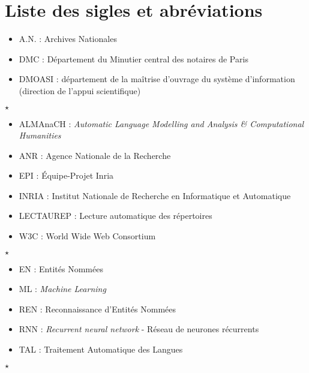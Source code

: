 \chapter*{Liste des sigles et abréviations}

\begin{itemize}
    \item A.N. : Archives Nationales
    \item DMC : Département du Minutier central des notaires de Paris  
    \item DMOASI : département de la maîtrise d’ouvrage du système d’information (direction de l’appui scientifique) 
\end{itemize}

\begin{center}
$\star$
\end{center} 

\begin{itemize}
    \item ALMAnaCH : \emph{Automatic Language Modelling and Analysis \& Computational Humanities}
    \item ANR : Agence Nationale de la Recherche
    \item EPI : Équipe-Projet Inria
    \item INRIA : Institut Nationale de Recherche en Informatique et Automatique
    \item LECTAUREP : Lecture automatique des répertoires
    \item W3C : World Wide Web Consortium
\end{itemize}

\begin{center}
$\star$
\end{center} 

\begin{itemize}
    \item EN : Entités Nommées
    \item ML : \emph{Machine Learning}
    \item REN : Reconnaissance d'Entités Nommées
    \item RNN : \emph{Recurrent neural network} - Réseau de neurones récurrents
    \item TAL : Traitement Automatique des Langues
\end{itemize}


\begin{center}
$\star$
\end{center} 

